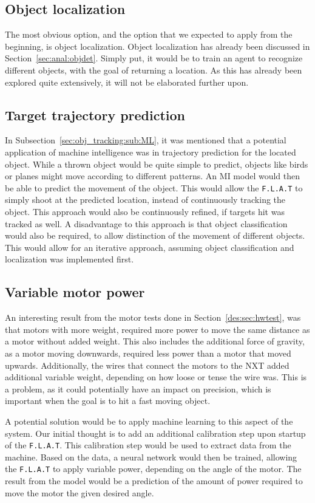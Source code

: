 \subsection{Object localization}
The most obvious option, and the option that we expected to apply from the beginning, is object localization.
Object localization has already been discussed in Section~\ref{sec:anal:objdet}.
Simply put, it would be to train an agent to recognize different objects, with the goal of returning a location.
As this has already been explored quite extensively, it will not be elaborated further upon.

\subsection{Target trajectory prediction}
In Subsection~\ref{sec:obj_tracking:sub:ML}, it was mentioned that a potential application of machine intelligence was in trajectory prediction for the located object.
While a thrown object would be quite simple to predict, objects like birds or planes might move according to different patterns.
An MI model would then be able to predict the movement of the object.
This would allow the \texttt{F.L.A.T} to simply shoot at the predicted location, instead of continuously tracking the object.
This approach would also be continuously refined, if targets hit was tracked as well.
A disadvantage to this approach is that object classification would also be required, to allow distinction of the movement of different objects.
This would allow for an iterative approach, assuming object classification and localization was implemented first.

\subsection{Variable motor power}
An interesting result from the motor tests done in Section~\ref{des:sec:hwtest}, was that motors with more weight, required more power to move the same distance as a motor without added weight.
This also includes the additional force of gravity, as a motor moving downwards, required less power than a motor that moved upwards.
Additionally, the wires that connect the motors to the NXT added additional variable weight, depending on how loose or tense the wire was.
This is a problem, as it could potentially have an impact on precision, which is important when the goal is to hit a fast moving object.

A potential solution would be to apply machine learning to this aspect of the system.
Our initial thought is to add an additional calibration step upon startup of the \texttt{F.L.A.T}.
This calibration step would be used to extract data from the machine.
Based on the data, a neural network would then be trained, allowing the \texttt{F.L.A.T} to apply variable power, depending on the angle of the motor.
The result from the model would be a prediction of the amount of power required to move the motor the given desired angle.

